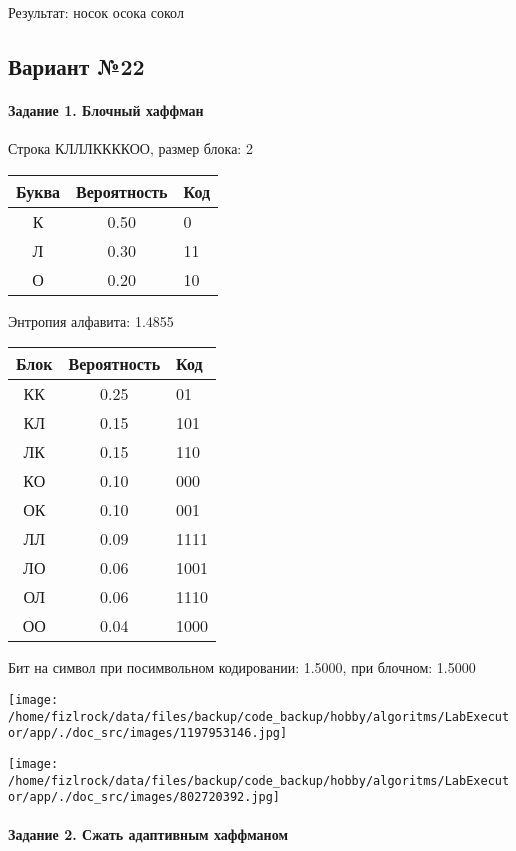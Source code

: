 \documentclass[a4paper, 12pt]{article}
\begin{document}
Результат: носок осока сокол
\pagebreak
\subsection{Вариант №22}
\paragraph{Задание 1. Блочный хаффман \\}

Строка КЛЛЛККККОО, размер блока: 2
\begin{center}
 \begin{tabular}{ |c|c|l| } 
  \hline
     Буква & Вероятность & Код\\ \hline
К & 0.50 & 0\\\hline
Л & 0.30 & 11\\\hline
О & 0.20 & 10
\\ \hline \end{tabular}
\end{center}
Энтропия алфавита: 1.4855
\begin{center}
 \begin{tabular}{ |c|c|l| } 
  \hline
     Блок & Вероятность & Код\\ \hline
КК & 0.25 & 01\\\hline
КЛ & 0.15 & 101\\\hline
ЛК & 0.15 & 110\\\hline
КО & 0.10 & 000\\\hline
ОК & 0.10 & 001\\\hline
ЛЛ & 0.09 & 1111\\\hline
ЛО & 0.06 & 1001\\\hline
ОЛ & 0.06 & 1110\\\hline
ОО & 0.04 & 1000
\\ \hline \end{tabular}
\end{center}
Бит на символ при посимвольном кодировании: 1.5000, при блочном: 1.5000

\texttt{[image: /home/fizlrock/data/files/backup/code\_backup/hobby/algoritms/LabExecutor/app/./doc\_src/images/1197953146.jpg]}

\texttt{[image: /home/fizlrock/data/files/backup/code\_backup/hobby/algoritms/LabExecutor/app/./doc\_src/images/802720392.jpg]}
\pagebreak
\paragraph{Задание 2. Сжать адаптивным хаффманом\\}
\end{document}
